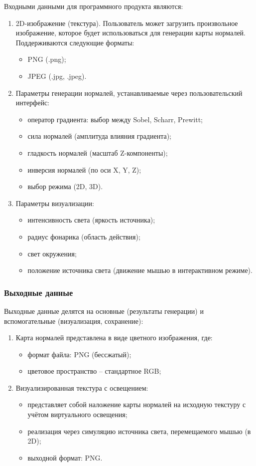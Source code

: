 Входными данными для программного продукта являются:
\begin{enumerate}
	\item 2D-изображение (текстура). Пользователь может загрузить произвольное изображение, которое будет использоваться для генерации карты нормалей. Поддерживаются следующие форматы:
	\begin{itemize}
		\item PNG (.png);
		\item JPEG (.jpg, .jpeg).
	\end{itemize}
	\item Параметры генерации нормалей, устанавливаемые через пользовательский интерфейс:
	\begin{itemize}
		\item оператор градиента: выбор между Sobel, Scharr, Prewitt;
		\item сила нормалей (амплитуда влияния градиента);
		\item гладкость нормалей (масштаб Z-компоненты);
		\item инверсия нормалей (по оси X, Y, Z);
		\item выбор режима (2D, 3D).
	\end{itemize}	
	\item Параметры визуализации:
	\begin{itemize}
		\item интенсивность света (яркость источника);
		\item радиус фонарика (область действия);
		\item свет окружения;
		\item положение источника света (движение мышью в интерактивном режиме).
	\end{itemize}	
\end{enumerate}
\subsubsection{Выходные данные}

Выходные данные делятся на основные (результаты генерации) и вспомогательные (визуализация, сохранение):
\begin{enumerate}
	\item Карта нормалей представлена в виде цветного изображения, где:
	\begin{itemize}
		\item формат файла: PNG (бессжатый);
		\item цветовое пространство -- стандартное RGB;
	\end{itemize}	
	\item Визуализированная текстура с освещением:
	\begin{itemize}
		\item представляет собой наложение карты нормалей на исходную текстуру с учётом виртуального освещения;
		\item реализация через симуляцию источника света, перемещаемого мышью (в 2D);
		\item выходной формат: PNG.
	\end{itemize}	
\end{enumerate}
